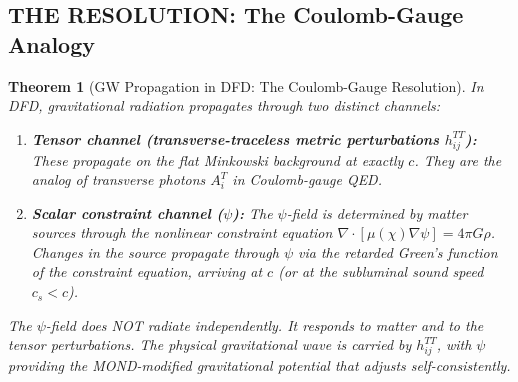 \documentclass[11pt,a4paper]{article}
\newtheorem{theorem}{Theorem}
\begin{document}
\subsection{THE RESOLUTION: The Coulomb-Gauge Analogy}
\label{sec:GW-resolution}

\begin{theorem}[GW Propagation in DFD: The Coulomb-Gauge Resolution]
\label{thm:GW-resolution}
In DFD, gravitational radiation propagates through two distinct channels:
\begin{enumerate}
\item \textbf{Tensor channel (transverse-traceless metric perturbations $h_{ij}^{TT}$):} These propagate on the flat Minkowski background at exactly $c$. They are the analog of transverse photons $A_i^T$ in Coulomb-gauge QED.
\item \textbf{Scalar constraint channel ($\psi$):} The $\psi$-field is determined by matter sources through the nonlinear constraint equation $\nabla \cdot [\mu(\chi)\nabla\psi] = 4\pi G\rho$. Changes in the source propagate through $\psi$ via the retarded Green's function of the constraint equation, arriving at $c$ (or at the subluminal sound speed $c_s < c$).
\end{enumerate}

The $\psi$-field does NOT radiate independently. It responds to matter and to the tensor perturbations. The physical gravitational wave is carried by $h_{ij}^{TT}$, with $\psi$ providing the MOND-modified gravitational potential that adjusts self-consistently.
\end{theorem}
\end{document}
